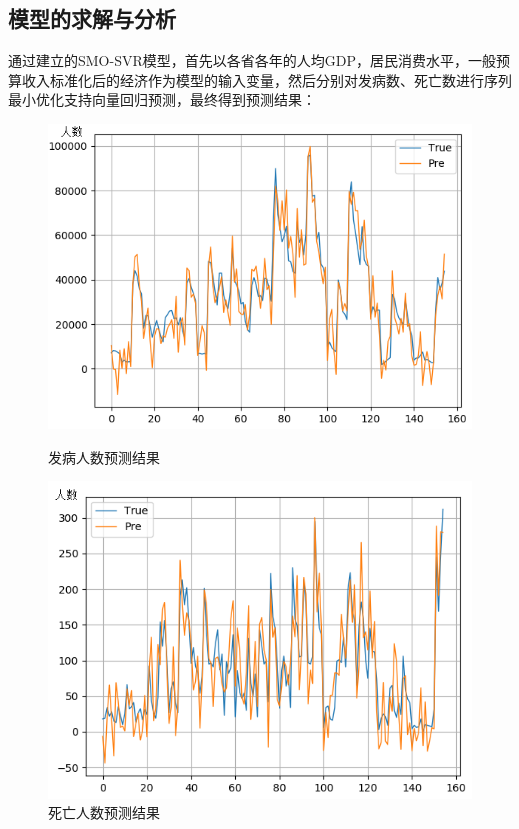 \documentclass{whutmod}
\begin{document}
     \subsection{模型的求解与分析}
     通过建立的SMO-SVR模型，首先以各省各年的人均GDP，居民消费水平，一般预算收入标准化后的经济作为模型的输入变量，然后分别对发病数、死亡数进行序列最小优化支持向量回归预测，最终得到预测结果：
     
     	\begin{figure}[H]
     	\begin{minipage}[t]{0.5\linewidth}
     	\centering
\includegraphics[width=\textwidth]{figures/Figure_9.png}
\caption{发病人数预测结果}\label{Figure_9}
     	\end{minipage}
     	\hfill%
     	\begin{minipage}[t]{0.5\linewidth}
     	\centering
\includegraphics[width=\textwidth]{figures/Figure_10.png}
\caption{死亡人数预测结果}\label{Figure_10}
     	\end{minipage}
     \end{figure}
 
\end{document}
